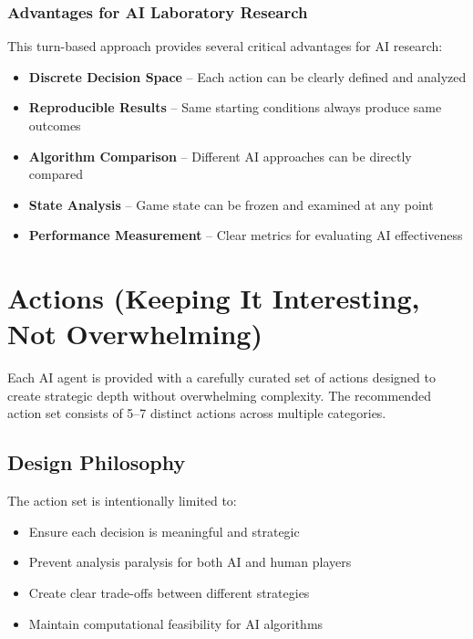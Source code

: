 \documentclass[12pt,a4paper]{article}
\begin{document}
\subsubsection{Advantages for AI Laboratory Research}

This turn-based approach provides several critical advantages for AI research:

\begin{itemize}
    \item \textbf{Discrete Decision Space} -- Each action can be clearly defined and analyzed
    \item \textbf{Reproducible Results} -- Same starting conditions always produce same outcomes
    \item \textbf{Algorithm Comparison} -- Different AI approaches can be directly compared
    \item \textbf{State Analysis} -- Game state can be frozen and examined at any point
    \item \textbf{Performance Measurement} -- Clear metrics for evaluating AI effectiveness
\end{itemize}

\section{Actions (Keeping It Interesting, Not Overwhelming)}

Each AI agent is provided with a carefully curated set of actions designed to create strategic depth without overwhelming complexity. The recommended action set consists of 5--7 distinct actions across multiple categories.

\subsection{Design Philosophy}

The action set is intentionally limited to:
\begin{itemize}
    \item Ensure each decision is meaningful and strategic
    \item Prevent analysis paralysis for both AI and human players
    \item Create clear trade-offs between different strategies
    \item Maintain computational feasibility for AI algorithms
\end{itemize}
\end{document}
